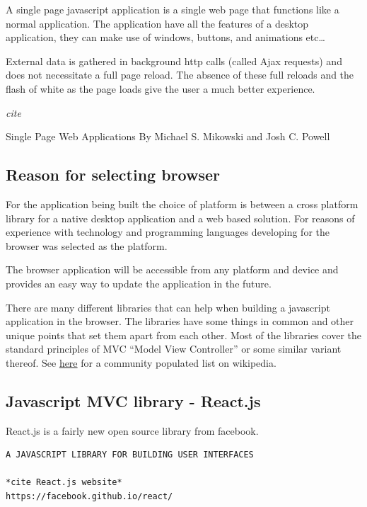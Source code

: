 A single page javascript application is a single web page that functions
like a normal application. The application have all the features of a
desktop application, they can make use of windows, buttons, and
animations etc\ldots{}

External data is gathered in background http calls (called Ajax
requests) and does not necessitate a full page reload. The absence of
these full reloads and the flash of white as the page loads give the
user a much better experience.

\emph{cite}

Single Page Web Applications By Michael S. Mikowski and Josh C. Powell

\subsection{Reason for selecting
browser}\label{reason-for-selecting-browser}

For the application being built the choice of platform is between a
cross platform library for a native desktop application and a web based
solution. For reasons of experience with technology and programming
languages developing for the browser was selected as the platform.

The browser application will be accessible from any platform and device
and provides an easy way to update the application in the future.

There are many different libraries that can help when building a
javascript application in the browser. The libraries have some things in
common and other unique points that set them apart from each other. Most
of the libraries cover the standard principles of MVC ``Model View
Controller'' or some similar variant thereof. See
\href{https://en.wikipedia.org/wiki/List_of_JavaScript_libraries\#Web-application_related_.28MVC.2C_MVVM.29}{here}
for a community populated list on wikipedia.

\subsection{Javascript MVC library -
React.js}\label{javascript-mvc-library---react.js}

React.js is a fairly new open source library from facebook.

\begin{verbatim}
A JAVASCRIPT LIBRARY FOR BUILDING USER INTERFACES

*cite React.js website*
https://facebook.github.io/react/
\end{verbatim}

